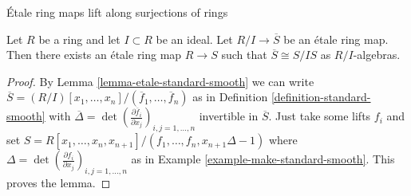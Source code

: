 \begin{lemma}
\label{lemma-lift-etale}
\begin{slogan}
\'Etale ring maps lift along surjections of rings
\end{slogan}
Let $R$ be a ring and let $I \subset R$ be an ideal.
Let $R/I \to \overline{S}$ be an \'etale ring map.
Then there exists an \'etale ring map
$R \to S$ such that $\overline{S} \cong S/IS$ as $R/I$-algebras.
\end{lemma}

\begin{proof}
By Lemma \ref{lemma-etale-standard-smooth} we can write
$\overline{S} =
(R/I)[x_1, \ldots, x_n]/(\overline{f}_1, \ldots, \overline{f}_n)$
as in Definition \ref{definition-standard-smooth} with
$\overline{\Delta} =
\det(\frac{\partial \overline{f}_i}{\partial x_j})_{i, j = 1, \ldots, n}$
invertible in $\overline{S}$. Just take some lifts $f_i$ and set
$S = R[x_1, \ldots, x_n, x_{n+1}]/(f_1, \ldots, f_n, x_{n + 1}\Delta - 1)$
where $\Delta = \det(\frac{\partial f_i}{\partial x_j})_{i, j = 1, \ldots, n}$
as in Example \ref{example-make-standard-smooth}.
This proves the lemma.
\end{proof}
